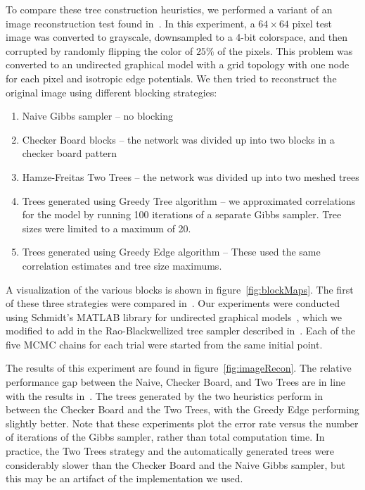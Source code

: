 \documentclass{article} %
\begin{document}

To compare these tree construction heuristics, we performed a variant of an
image reconstruction test found in~\cite{hamze2004fields}. In this experiment,
a $64\times64$ pixel test image was converted to grayscale, downsampled to a
4-bit colorspace, and then corrupted by randomly flipping the color of $25\%$
of the pixels. This problem was converted to an undirected graphical model with
a grid topology with one node for each pixel and isotropic edge potentials.  We
then tried to reconstruct the original image using different blocking strategies:

\begin{enumerate}
\item Naive Gibbs sampler -- no blocking
\item Checker Board blocks -- the network was divided up into two blocks in a checker board pattern
\item Hamze-Freitas Two Trees -- the network was divided up into two meshed trees
\item Trees generated using Greedy Tree algorithm -- we approximated correlations for the model by running 100 iterations of a separate Gibbs sampler. Tree sizes were limited to a maximum of 20.
\item Trees generated using Greedy Edge algorithm -- These used the same correlation estimates and tree size maximums.
\end{enumerate}

A visualization of the various blocks is shown in figure~\ref{fig:blockMaps}. The
first of these three strategies were compared in~\cite{hamze2004fields}.  Our
experiments were conducted using Schmidt's MATLAB library for undirected
graphical models~\cite{schmidt07ugm}, which we modified to add in the
Rao-Blackwellized tree sampler described in~\cite{hamze2004fields}. Each of the
five MCMC chains for each trial were started from the same initial point.

The results of this experiment are found in figure~\ref{fig:imageRecon}. The
relative performance gap between the Naive, Checker Board, and Two Trees are in
line with the results in~\cite{hamze2004fields}. The trees generated by the two
heuristics perform in between the Checker Board and the Two Trees, with the
Greedy Edge performing slightly better. Note that these experiments plot the
error rate versus the number of iterations of the Gibbs sampler, rather than
total computation time. In practice, the Two Trees strategy and the
automatically generated trees were considerably slower than the Checker Board
and the Naive Gibbs sampler, but this may be an artifact of the implementation
we used.
\end{document}
